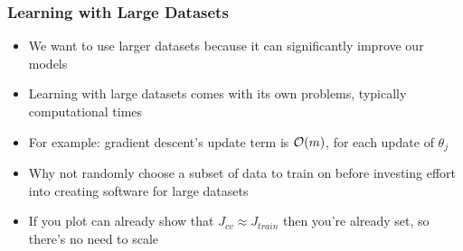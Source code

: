 \subsubsection{Learning with Large Datasets}
\begin{itemize}[--]
	\item We want to use larger datasets because it can significantly improve our models
	\item Learning with large datasets comes with its own problems, typically computational times
	\item For example: gradient descent's update term is $\mathcal{O}(m)$, for each update of $\theta_j$
	\item Why not randomly choose a subset of data to train on before investing effort into creating software for large datasets
	\item If you plot can already show that $J_{cv}\approx J_{train}$ then you're already set, so there's no need to scale
\end{itemize}

